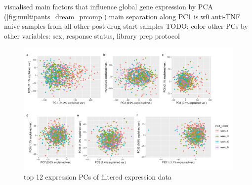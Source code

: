 \begin{outline}
\1 visualised main factors that influence global gene expression by PCA (\autoref{fig:multipants_dream_prcomp})
    \2 main separation along PC1 is w0 anti-TNF naive samples from all other post-drug start samples 
    \2 TODO: color other PCs by other variables: sex, response status, library prep protocol

\begin{figure}
    \centering
    \includegraphics[width=1.0\textwidth,page=1]{mainmatter/figures/chapter_04/dream.prcomp.pdf}
    \caption{top 12 expression PCs of filtered expression data}
    \label{fig:multipants_dream_prcomp}
\end{figure}


\end{outline}
